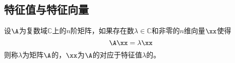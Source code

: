 \subsection{特征值与特征向量}

\begin{frame}[fragile]\ft{\subsecname}


  \begin{dingyi}[特征值与特征向量]
    设$\A$为复数域$\mathbb C$上的$n$阶矩阵，如果存在数$\lambda\in\mathbb C$和非零的$n$维向量$\xx$使得
    $$
    \A\xx=\lambda\xx
    $$
    则称$\lambda$为矩阵$\A$的，$\xx$为$\A$的对应于特征值$\lambda$的。
  \end{dingyi} 









\end{frame}
